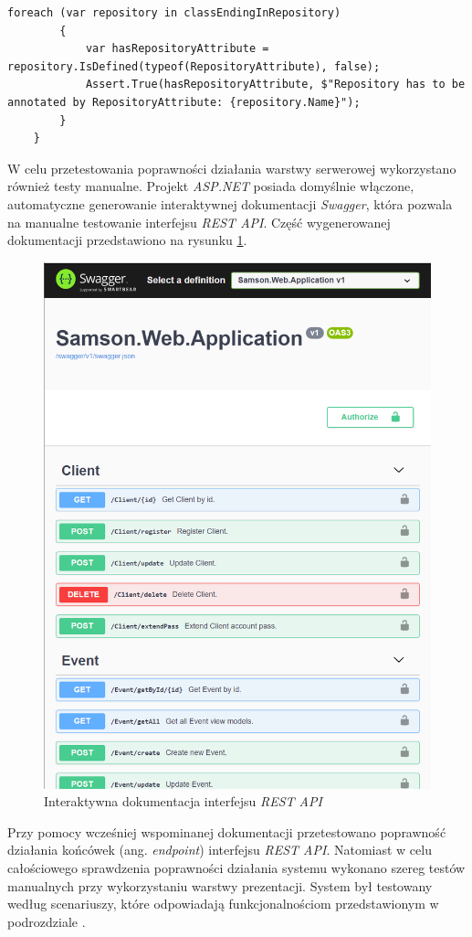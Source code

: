 \documentclass[a4paper,twoside,12pt]{book}
\newcommand{\obcy}[1]{\emph{#1}}
\newcommand{\ang}[1]{{\selectlanguage{british}\obcy{#1}}}
\begin{document}
{\begin{lstlisting}[caption={Przykładowy test klasy \textit{ConventionUnitTest}}, label={lst:repositoryAttributeUnitTest}]
		foreach (var repository in classEndingInRepository)
		{
			var hasRepositoryAttribute = repository.IsDefined(typeof(RepositoryAttribute), false);
			Assert.True(hasRepositoryAttribute, $"Repository has to be annotated by RepositoryAttribute: {repository.Name}");
		}
	}
\end{lstlisting}
W celu przetestowania poprawności działania warstwy serwerowej wykorzystano również testy manualne. Projekt \textit{ASP.NET} posiada domyślnie włączone, automatyczne generowanie interaktywnej dokumentacji \textit{Swagger}, która pozwala na manualne testowanie interfejsu \textit{REST API}. Część wygenerowanej dokumentacji przedstawiono na rysunku \ref{fig:swagger}.
\begin{figure}[htbp]
	\centering
	\includegraphics[width=1\linewidth]{../zrzuty_ekranu/testy/swagger}
	\caption{Interaktywna dokumentacja interfejsu \textit{REST API}}
	\label{fig:swagger}
\end{figure}
Przy pomocy wcześniej wspominanej dokumentacji przetestowano poprawność działania końcówek (ang. \ang{endpoint}) interfejsu \textit{REST API}. Natomiast w celu całościowego sprawdzenia poprawności działania systemu wykonano szereg testów manualnych przy wykorzystaniu warstwy prezentacji. System był testowany według scenariuszy, które odpowiadają funkcjonalnościom przedstawionym w podrozdziale \textbf{}.

}
\end{document}
